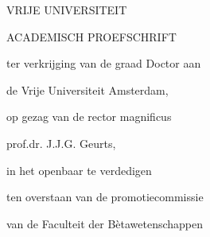 \begin{titlepage}






\cleardoublepage
\thispagestyle{empty}

\begin{center}


VRIJE UNIVERSITEIT

\vspace*{4\bigskipamount}

{\makeatletter
\titlestyle\bfseries\LARGE\@title
\makeatother}

{\makeatletter
\ifx\@subtitle\undefined\else
    \bigskip
    \titlefont\titleshape\Large\@subtitle
\fi
\makeatother}

\vspace*{5\bigskipamount}


{ACADEMISCH PROEFSCHRIFT}

\bigskip
\bigskip

ter verkrijging van de graad Doctor aan

de Vrije Universiteit Amsterdam,

op gezag van de rector magnificus

prof.dr. J.J.G. Geurts,

in het openbaar te verdedigen

ten overstaan van de promotiecommissie

van de Faculteit der Bètawetenschappen


\end{center}
\end{titlepage}
